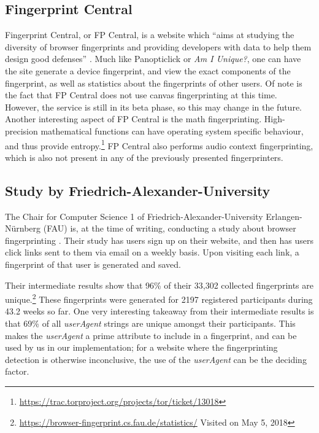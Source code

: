 \documentclass[
    fontsize=12pt,
    headings=small,
    parskip=half,
    bibliography=totoc,
    numbers=noenddot,
    open=any
    ]{scrreprt}
\begin{document}
\subsection{Fingerprint Central}
\label{related_work:fp_central}
Fingerprint Central, or FP Central, is a website which ``aims at studying the diversity
of browser fingerprints and providing developers with data to help them design good defenses'' \cite{fpcentral}.
Much like Panopticlick or \textit{Am I Unique?}, one can have the site generate a device fingerprint,
and view the exact components of the fingerprint, as well as statistics about the fingerprints of other users.
Of note is the fact that FP Central does not use canvas fingerprinting at this time.
However, the service is still in its beta phase, so this may change in the future.
Another interesting aspect of FP Central is the math fingerprinting.
High-precision mathematical functions can have operating system specific behaviour, and thus provide
entropy.\footnote{\url{https://trac.torproject.org/projects/tor/ticket/13018}}
FP Central also performs audio context fingerprinting, which is also not present in any of the previously presented
fingerprinters.

\subsection{Study by Friedrich-Alexander-University}
\label{related_work:fau}
The Chair for Computer Science 1 of Friedrich-Alexander-University Erlangen-Nürnberg (FAU)
is, at the time of writing, conducting a study about
browser fingerprinting \cite{fau_fingerprinting}.
Their study has users sign up on their website, and then has users click links
sent to them via email on a weekly basis. Upon visiting each link, a fingerprint of that user is
generated and saved.

Their intermediate results show that 96\% of their 33,302 collected fingerprints are
unique.\footnote{\url{https://browser-fingerprint.cs.fau.de/statistics/} Visited on May 5, 2018}
These fingerprints were generated for 2197 registered participants during 43.2 weeks so far.
One very interesting takeaway from their intermediate results is that 69\%
of all \textit{userAgent} strings are unique amongst their participants.
This makes the \textit{userAgent} a prime attribute to include in a fingerprint,
and can be used by us in our implementation; for a website where the fingerprinting detection
is otherwise inconclusive, the use of the \textit{userAgent} can be the deciding factor.
\end{document}
